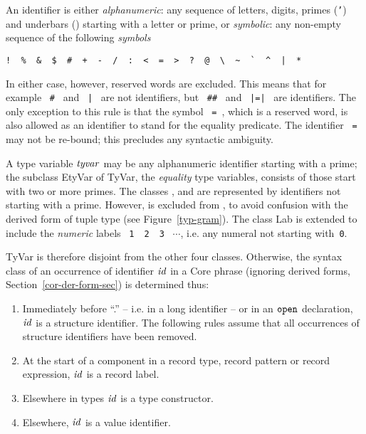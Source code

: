 An identifier is either {\sl alphanumeric}: any sequence of
letters, digits, primes ({\tt '}) and underbars (\wildpat) starting
with a letter or prime, or {\sl symbolic}: any non-empty sequence of the
following {\sl symbols}
\vspace*{-6pt}
\begin{center}
\verb(!  %  &  $  #  +  -  /  :  <  =  >  ?  @  \  ~  `  ^  |  *(
\end{center}
\vspace*{-6pt}
In either case, however, reserved words are excluded.   This means that for
example ~\verb+#+~ and ~{\tt |}~ are not identifiers, but  ~\verb+##+~ and
~{\tt |=|}~ are identifiers.
The only exception to this rule is that the symbol ~{\tt =}~, which is
a reserved word, is also allowed as an identifier to stand for
the equality predicate.
The identifier ~{\tt =}~ may not be re-bound;
this precludes any syntactic ambiguity.

A type variable ${\it tyvar}$\label{etyvar-lab} may be any
alphanumeric identifier starting with a prime; the subclass EtyVar of
TyVar, the {\sl equality} type variables, consists of those 
start with two or more primes.
The classes {\VId},
{\TyCon} and  {\Lab} are represented by identifiers
not starting with a prime.
However, {\tt *} is excluded from {\TyCon},
to avoid confusion with the derived form of tuple type (see
Figure~\ref{typ-gram}). The class Lab is extended to
include the {\em numeric} labels ~{\tt 1}~~{\tt 2}~~{\tt 3}~ $\cdots$,
i.e. any numeral not starting with~{\tt 0}. 

TyVar is therefore disjoint from the other four classes.
Otherwise, the syntax class of an occurrence of
identifier ${\it id}$ in a Core phrase (ignoring derived forms,
Section~\ref{cor-der-form-sec}) is determined thus:
\begin{enumerate}
  \item Immediately before ``.'' -- i.e. in a long identifier -- or in an
        ${\tt open}$ declaration, ${\it id}$ is a structure
        identifier.  The following rules assume that all occurrences of
        structure identifiers have been removed.
  \item At the start of a component in a record type, record pattern or record
        expression,  ${\it id}$ is a record label.
  \item Elsewhere in types ${\it id}$ is a type constructor.
  \item Elsewhere, ${\it id}$ is a value identifier.
\end{enumerate}%

